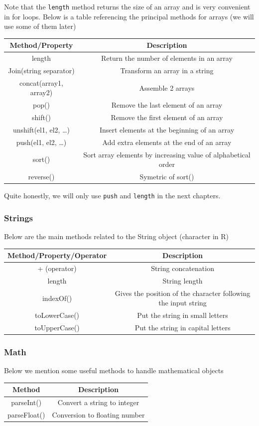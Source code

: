 \documentclass[]{book}
\begin{document}
Note that the \texttt{length} method returns the size of an array and is very convenient in for loops. Below is a table referencing the principal methods for arrays (we will use some of them later)

\begin{longtable}[]{@{}cc@{}}
\toprule
Method/Property & Description\tabularnewline
\midrule
\endhead
length & Return the number of elements in an array\tabularnewline
Join(string separator) & Transform an array in a string\tabularnewline
concat(array1, array2) & Assemble 2 arrays\tabularnewline
pop() & Remove the last element of an array\tabularnewline
shift() & Remove the first element of an array\tabularnewline
unshift(el1, el2, \ldots{}) & Insert elements at the beginning of an array\tabularnewline
push(el1, el2, \ldots{}) & Add extra elements at the end of an array\tabularnewline
sort() & Sort array elements by increasing value of alphabetical order\tabularnewline
reverse() & Symetric of sort()\tabularnewline
\bottomrule
\end{longtable}

Quite honestly, we will only use \texttt{push} and \texttt{length} in the next chapters.

\hypertarget{strings}{%
\subsubsection{Strings}\label{strings}}

Below are the main methods related to the String object (character in R)

\begin{longtable}[]{@{}cc@{}}
\toprule
Method/Property/Operator & Description\tabularnewline
\midrule
\endhead
+ (operator) & String concatenation\tabularnewline
length & String length\tabularnewline
indexOf() & Gives the position of the character following the input string\tabularnewline
toLowerCase() & Put the string in small letters\tabularnewline
toUpperCase() & Put the string in capital letters\tabularnewline
\bottomrule
\end{longtable}

\hypertarget{math}{%
\subsubsection{Math}\label{math}}

Below we mention some useful methods to handle mathematical objects

\begin{longtable}[]{@{}cc@{}}
\toprule
Method & Description\tabularnewline
\midrule
\endhead
parseInt() & Convert a string to integer\tabularnewline
parseFloat() & Conversion to floating number\tabularnewline
\bottomrule
\end{longtable}
\end{document}
